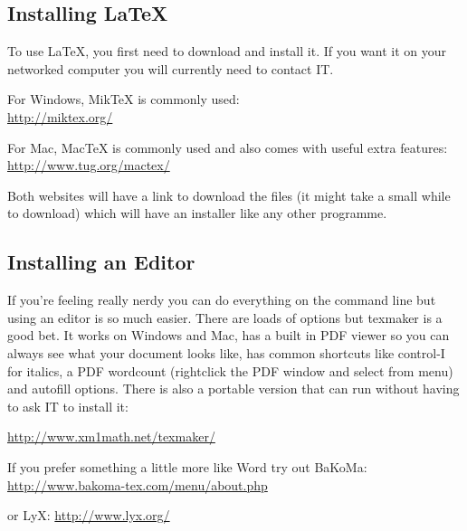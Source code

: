 \documentclass[11pt,a4paper,oneside]{article}
\begin{document}
\subsection{Installing \LaTeX}
To use \LaTeX, you first need to download and install it.  If you want it on your networked computer you will currently need to contact IT. 

For Windows, MikTeX is commonly used:\\
\url{http://miktex.org/}

For Mac,  MacTeX is commonly used and also comes with useful extra features:\\
\url{http://www.tug.org/mactex/}

Both websites will have a link to download the files (it might take a small while to download) which will have an installer like any other programme. 

\subsection{Installing an Editor}
If you're feeling really nerdy you can do everything on the command line but using an editor is so much easier.  There are loads of options but texmaker is a good bet.  It works on Windows and Mac, has a built in PDF viewer so you can always see what your document looks like, has common shortcuts like control-I for italics, a PDF wordcount (rightclick the PDF window and select from menu) and autofill options. There is also a portable version that can run without having to ask IT to install it:

\url{http://www.xm1math.net/texmaker/}

If you prefer something a little more like Word try out BaKoMa:\\
\url{http://www.bakoma-tex.com/menu/about.php}

or LyX:
\url{http://www.lyx.org/}
\end{document}
